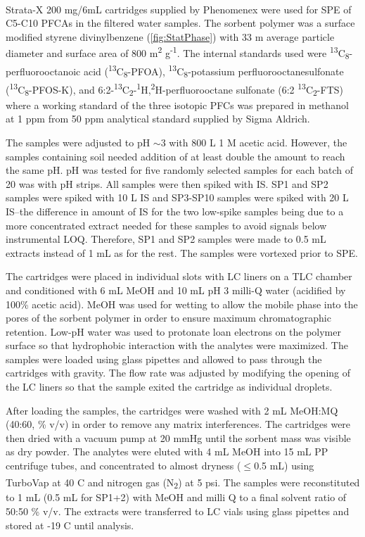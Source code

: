 Strata-X\textsuperscript{\textregistered} 200 mg/6mL cartridges supplied by Phenomenex were used for SPE of C5-C10 PFCAs in the filtered water samples. The sorbent polymer was a surface modified styrene divinylbenzene (\cref{fig:StatPhase}) with 33 \textmu m average particle diameter and surface area of 800 m\textsuperscript{2} g\textsuperscript{-1}. The internal standards used were \textsuperscript{13}C\textsubscript{8}-perfluorooctanoic acid  (\textsuperscript{13}C\textsubscript{8}-PFOA), \textsuperscript{13}C\textsubscript{8}-potassium perfluorooctanesulfonate (\textsuperscript{13}C\textsubscript{8}-PFOS-K), and 6:2-\textsuperscript{13}C\textsubscript{2}-\textsuperscript{1}H,\textsuperscript{2}H-perfluorooctane sulfonate  (6:2 \textsuperscript{13}C\textsubscript{2}-FTS) where a working standard of the three isotopic PFCs was prepared in methanol at 1 ppm from 50 ppm analytical standard supplied by Sigma Aldrich.

The samples were adjusted to pH $\sim$3 with 800 \textmu L 1 M acetic acid. However, the samples containing soil needed addition of at least double the amount to reach the same pH. pH was tested for five randomly selected samples for each batch of 20 was with pH strips. All samples were then spiked with IS. SP1 and SP2 samples were spiked with 10 \textmu L IS and SP3-SP10 samples were spiked with 20 \textmu L IS--the difference in amount of IS for the two low-spike samples being due to a more concentrated extract needed for these samples to avoid signals below instrumental LOQ. Therefore, SP1 and SP2 samples were made to 0.5 mL extracts instead of 1 mL as for the rest. The samples were vortexed prior to SPE.

The cartridges were placed in individual slots with LC liners on a TLC chamber and conditioned with 6 mL MeOH and 10 mL pH 3 milli-Q water (acidified by 100\% acetic acid). MeOH was used for wetting to allow the mobile phase into the pores of the sorbent polymer in order to ensure maximum chromatographic retention. Low-pH water was used to protonate loan electrons on the polymer surface so that hydrophobic interaction with the analytes were maximized. The samples were loaded using glass pipettes and allowed to pass through the cartridges with gravity. The flow rate was adjusted by modifying the opening of the LC liners so that the sample exited the cartridge as individual droplets. 

After loading the samples, the cartridges were washed with 2 mL MeOH:MQ (40:60, \% v/v) in order to remove any matrix interferences. The cartridges were then dried with a vacuum pump at 20 mmHg until the sorbent mass was visible as dry powder. The analytes were eluted with 4 mL MeOH into 15 mL PP centrifuge tubes, and concentrated to almost dryness ($\le$0.5 mL) using TurboVap\textsuperscript{\textregistered} at 40 \textdegree C and nitrogen gas (N\textsubscript{2}) at 5 psi. The samples were reconstituted to 1 mL (0.5 mL for SP1+2) with MeOH and milli Q to a final solvent ratio of 50:50 \% v/v. The extracts were transferred to LC vials using glass pipettes and stored at -19 \textdegree C until analysis.


